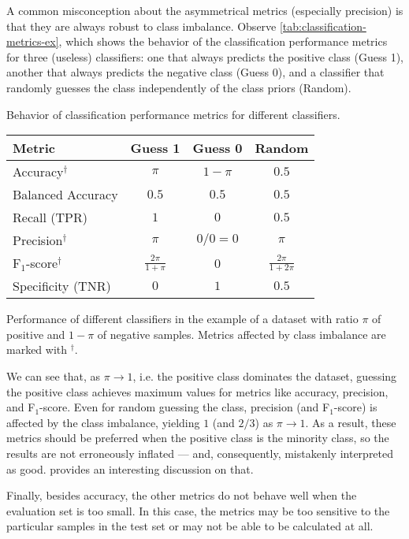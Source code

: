 A common misconception about the asymmetrical metrics (especially precision) is that they
are always robust to class imbalance.  Observe \cref{tab:classification-metrics-ex}, which shows
the behavior of the classification performance metrics for three (useless) classifiers: one
that always predicts the positive class (Guess 1), another that always predicts the
negative class (Guess 0), and a classifier that randomly guesses the class independently
of the class priors (Random).

\begin{tablebox}[label=tab:classification-metrics-ex]{Behavior of classification
  performance metrics for different classifiers.}
  \centering
  \begin{tabular}{l c c c}
    \toprule
    \textbf{Metric} & \textbf{Guess 1} & \textbf{Guess 0} & \textbf{Random} \\
    \midrule
    Accuracy$^\dagger$ & $\pi$ & $1 - \pi$ & $0.5$ \\
    Balanced Accuracy & $0.5$ & $0.5$ & $0.5$ \\
    Recall (TPR) & $1$ & $0$ & $0.5$ \\
    Precision$^\dagger$ & $\pi$ & $0/0 = 0$ & $\pi$ \\
    F$_1$-score$^\dagger$ & $\frac{2 \pi}{1 + \pi}$ & 0 & $\frac{2 \pi}{1 + 2\pi}$ \\
    Specificity (TNR) & $0$ & $1$ & $0.5$ \\
    \bottomrule
  \end{tabular}
  \tcblower
  Performance of different classifiers in the example of a dataset with ratio $\pi$ of
  positive and $1-\pi$ of negative samples.  Metrics affected by class imbalance are
  marked with $^\dagger$.
\end{tablebox}

We can see that, as $\pi \to 1$, i.e. the positive class dominates the dataset, guessing
the positive class achieves maximum values for metrics like accuracy, precision, and
F$_1$-score.  Even for random guessing the class, precision (and F$_1$-score) is affected
by the class imbalance, yielding $1$ (and $2/3$) as $\pi \to 1$.  As a result, these
metrics should be preferred when the positive class is the minority class, so the results
are not erroneously inflated --- and, consequently, mistakenly interpreted as good.
\textcite{Williams2021} provides an interesting discussion on
that.

Finally, besides accuracy, the other metrics do not behave well when the evaluation set is
too small.  In this case, the metrics may be too sensitive to the particular samples in
the test set or may not be able to be calculated at all.

